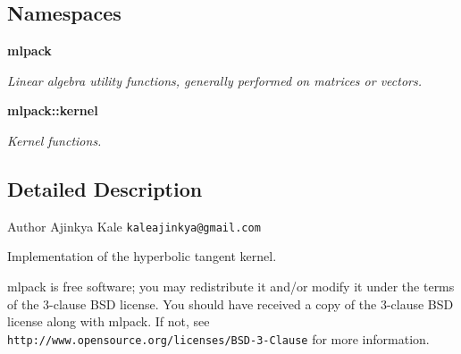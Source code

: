 \subsection*{Namespaces}
\begin{DoxyCompactItemize}
\item 
 \textbf{ mlpack}
\begin{DoxyCompactList}\small\item\em Linear algebra utility functions, generally performed on matrices or vectors. \end{DoxyCompactList}\item 
 \textbf{ mlpack\+::kernel}
\begin{DoxyCompactList}\small\item\em Kernel functions. \end{DoxyCompactList}\end{DoxyCompactItemize}


\subsection{Detailed Description}
\begin{DoxyAuthor}{Author}
Ajinkya Kale {\tt kaleajinkya@gmail.\+com}
\end{DoxyAuthor}
Implementation of the hyperbolic tangent kernel.

mlpack is free software; you may redistribute it and/or modify it under the terms of the 3-\/clause B\+SD license. You should have received a copy of the 3-\/clause B\+SD license along with mlpack. If not, see {\tt http\+://www.\+opensource.\+org/licenses/\+B\+S\+D-\/3-\/\+Clause} for more information. 